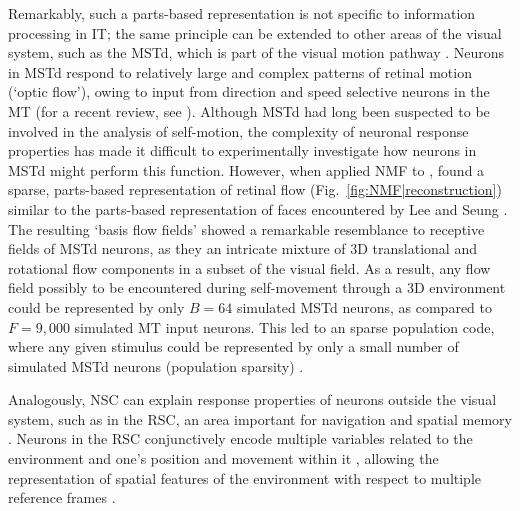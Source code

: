 Remarkably, such a parts-based representation is not specific to
information processing in \ac{IT};
the same principle can be extended to other areas of the visual system,
such as the \ac{MSTd},
which is part of the visual motion pathway \cite{Beyeler2016}.
Neurons in \ac{MSTd} respond to relatively large and complex patterns
of retinal motion (`optic flow'),
owing to input from direction and speed selective neurons in the \ac{MT}
(for a recent review, see \cite{Orban2007}).
Although \ac{MSTd} had long been suspected to be involved in the
analysis of self-motion,
the complexity of neuronal response properties has made it difficult
to experimentally investigate how neurons in \ac{MSTd}
might perform this function.
However, when  
applied \ac{NMF} to 
\cite{Beyeler2016},
 found a sparse, parts-based representation of retinal flow
(Fig.~\ref{fig:NMF|reconstruction})
similar to the parts-based representation of faces
encountered by Lee and Seung \cite{LeeSeung1999}.
The resulting `basis flow fields' showed a remarkable resemblance to receptive fields
of \ac{MSTd} neurons, as they 
an intricate mixture of
3D translational and rotational flow components
in a subset of the visual field.
As a result, any flow field possibly to be encountered 
during self-movement through a 3D environment
could be represented by only $B = 64$ simulated \ac{MSTd} neurons,
as compared to $F = 9,000$ simulated \ac{MT} input neurons.
This led to an sparse  population code,
where any given stimulus could be represented
by only a small number of simulated \ac{MSTd} neurons (population sparsity)
\cite{Beyeler2016}.

Analogously, \ac{NSC} can explain response properties
of neurons outside the visual system, 
such as in the \acf{RSC}, an area important for navigation and spatial memory \cite{Miller2014,Nelson2015,VannAggleton2009}.
Neurons in the \ac{RSC} conjunctively encode multiple variables related to the environment and one's position and movement within it
,
allowing the representation of spatial features of the environment 
with respect to multiple reference frames \cite{AlexanderNitz2015}.

